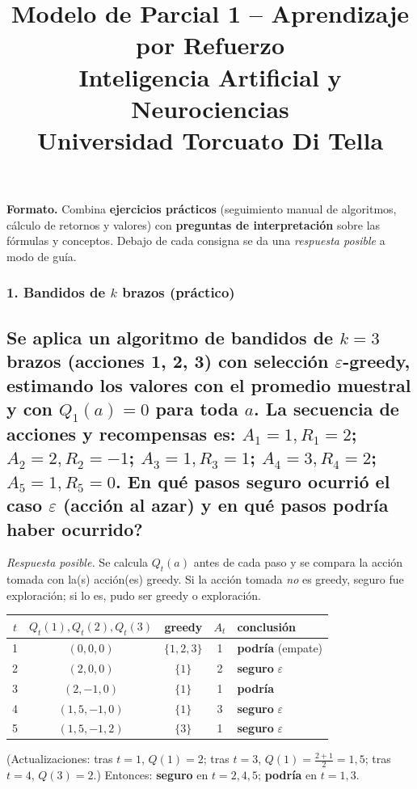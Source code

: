 \documentclass[11pt, a4paper]{article}
\title{\textbf{Modelo de Parcial 1 -- Aprendizaje por Refuerzo} \\
\large Inteligencia Artificial y Neurociencias \\ Universidad Torcuato Di Tella}
\author{}
\date{}
\newcommand{\pregunta}[1]{\subsection{#1}}
\newcommand{\eje}[1]{\subsubsection{#1}}
\begin{document}
\maketitle

\begin{mdframed}[linecolor=black, linewidth=0.7pt]
\textbf{Formato.} Combina \textbf{ejercicios pr\'acticos} (seguimiento manual de algoritmos, c\'alculo de retornos y valores) con \textbf{preguntas de interpretaci\'on} sobre las f\'ormulas y conceptos. Debajo de cada consigna se da una \emph{respuesta posible} a modo de gu\'ia.
\end{mdframed}

\eje{1. Bandidos de $k$ brazos (pr\'actico)}
\pregunta{Se aplica un algoritmo de bandidos de $k=3$ brazos (acciones 1, 2, 3) con selecci\'on $\varepsilon$-greedy, estimando los valores con el promedio muestral y con $Q_1(a)=0$ para toda $a$. La secuencia de acciones y recompensas es: $A_1{=}1, R_1{=}2$; $A_2{=}2, R_2{=}{-}1$; $A_3{=}1, R_3{=}1$; $A_4{=}3, R_4{=}2$; $A_5{=}1, R_5{=}0$. \textquestiondown En qu\'e pasos \textbf{seguro} ocurri\'o el caso $\varepsilon$ (acci\'on al azar) y en qu\'e pasos \textbf{podr\'ia} haber ocurrido?}

\begin{respuesta}
\textit{Respuesta posible.} Se calcula $Q_t(a)$ antes de cada paso y se compara la acci\'on tomada con la(s) acci\'on(es) greedy. Si la acci\'on tomada \emph{no} es greedy, seguro fue exploraci\'on; si lo es, pudo ser greedy o exploraci\'on.

\begin{center}
\begin{tabular}{c c c c l}
\toprule
$t$ & $Q_t(1),Q_t(2),Q_t(3)$ & greedy & $A_t$ & conclusi\'on \\
\midrule
1 & $(0,0,0)$        & $\{1,2,3\}$ & 1 & \textbf{podr\'ia} (empate) \\
2 & $(2,0,0)$        & $\{1\}$     & 2 & \textbf{seguro} $\varepsilon$ \\
3 & $(2,-1,0)$       & $\{1\}$     & 1 & \textbf{podr\'ia} \\
4 & $(1{,}5,-1,0)$   & $\{1\}$     & 3 & \textbf{seguro} $\varepsilon$ \\
5 & $(1{,}5,-1,2)$   & $\{3\}$     & 1 & \textbf{seguro} $\varepsilon$ \\
\bottomrule
\end{tabular}
\end{center}

\noindent (Actualizaciones: tras $t{=}1$, $Q(1){=}2$; tras $t{=}3$, $Q(1){=}\frac{2+1}{2}{=}1{,}5$; tras $t{=}4$, $Q(3){=}2$.)
Entonces: \textbf{seguro} en $t=2,4,5$; \textbf{podr\'ia} en $t=1,3$.
\end{respuesta}
\end{document}
